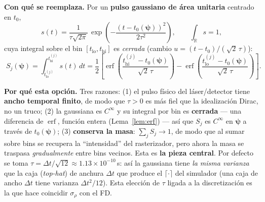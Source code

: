 \documentclass[11pt,a4paper]{article}
\theoremstyle{plain}
\theoremstyle{definition}
\newcommand{\vect}[1]{\boldsymbol{#1}}
\newcommand{\R}{\mathbb{R}}
\newcommand{\erf}{\operatorname{erf}}
\begin{document}
\textbf{Con qu\'e se reemplaza.} Por un \textbf{pulso gaussiano de \'area
unitaria} centrado en $t_0$,
\begin{equation}
    s(t)=\frac{1}{\tau\sqrt{2\pi}}\,
    \exp\!\left(-\frac{(t-t_0(\vect{\psi}))^2}{2\tau^2}\right),
    \qquad
    \int_{\R} s = 1,
    \label{eq:pulse}
\end{equation}
cuya integral sobre el bin $[t_{\mathrm{lo}},t_{\mathrm{hi}}]$ es \emph{cerrada}
(cambio $u=(t-t_0)/(\sqrt2\,\tau)$):
\begin{equation}
    \boxed{\;
    S_j(\vect{\psi})
    =\int_{t^{(j)}_{\mathrm{lo}}}^{t^{(j)}_{\mathrm{hi}}} s(t)\,dt
    =\frac{1}{2}
    \left[
        \erf\!\left(\frac{t^{(j)}_{\mathrm{hi}}-t_0(\vect{\psi})}{\sqrt2\,\tau}\right)
        -\erf\!\left(\frac{t^{(j)}_{\mathrm{lo}}-t_0(\vect{\psi})}{\sqrt2\,\tau}\right)
    \right].
    \;}
    \label{eq:erf-bin}
\end{equation}

\textbf{Por qu\'e esta opci\'on.} Tres razones: (1) el pulso f\'isico del
l\'aser/detector tiene \textbf{ancho temporal finito}, de modo que $\tau>0$ es
m\'as fiel que la idealizaci\'on Dirac, no un truco; (2) la gaussiana es
$C^\infty$ y su integral por bin es \textbf{cerrada} --- una diferencia de $\erf$,
funci\'on entera (Lema~\ref{lem:erf}) --- as\'i que $S_j$ es $C^\infty$ en
$\vect{\psi}$ a trav\'es de $t_0(\vect{\psi})$; (3) \textbf{conserva la masa}:
$\sum_j S_j\to1$, de modo que al sumar sobre bins se recupera la ``intensidad''
del rasterizador, pero ahora la masa se traspasa \emph{gradualmente} entre bins
vecinos. Esta es \textbf{la pieza central}. Por defecto se toma
$\tau=\Delta t/\sqrt{12}\approx1.13\times10^{-10}$\,s: as\'i la gaussiana tiene
\emph{la misma varianza} que la caja (\emph{top-hat}) de anchura $\Delta t$ que
produce el $\lceil\cdot\rceil$ del simulador (una caja de ancho $\Delta t$ tiene
varianza $\Delta t^2/12$). Esta elecci\'on de $\tau$ ligada a la discretizaci\'on
es la que hace coincidir $\sigma_\rho$ con el FD.
\end{document}
